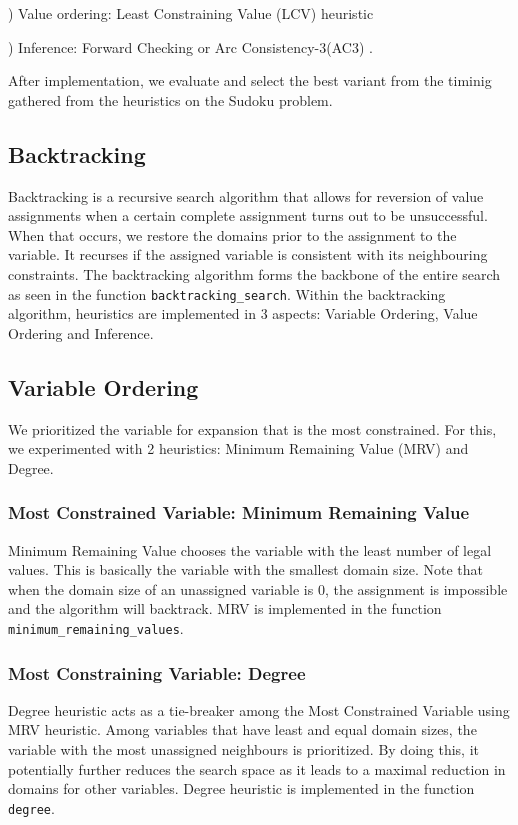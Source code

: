 \documentclass[9.5pt]{extarticle}
\begin{document}
\indent {}) Value ordering: Least Constraining Value (LCV) heuristic 

\indent {}) Inference: Forward Checking or Arc Consistency-3(AC3) .  

After implementation, we evaluate and select the best variant from the timinig gathered from the \indent heuristics on the Sudoku problem. 

\subsection{Backtracking}

Backtracking is a recursive search algorithm that allows for reversion of value assignments when a certain complete assignment turns out to be unsuccessful. When that occurs, we restore the domains prior to the assignment to the variable. It recurses if the assigned variable is consistent with its neighbouring constraints.  The backtracking algorithm forms the backbone of the entire search as seen in the function \verb`backtracking_search`. Within the backtracking algorithm, heuristics are implemented in 3 aspects: Variable Ordering, Value Ordering and Inference.

\subsection{Variable Ordering}
We prioritized the variable for expansion that is the most constrained. For this, we experimented with 2 heuristics: Minimum Remaining Value (MRV) and Degree.

\subsubsection{Most Constrained Variable: Minimum Remaining Value}

Minimum Remaining Value chooses the variable with the least number of legal values. This is basically the variable with the smallest domain size. Note that when the domain size of an unassigned variable is 0, the assignment is impossible and the algorithm will backtrack. MRV is implemented in the function \verb`minimum_remaining_values`.

\subsubsection{Most Constraining Variable: Degree}
Degree heuristic acts as a tie-breaker among the Most Constrained Variable using MRV heuristic. Among variables that have least and equal domain sizes, the variable with the most unassigned neighbours is prioritized. By doing this, it potentially further reduces the search space as it leads to a maximal reduction in domains for other variables. Degree heuristic is implemented in the function \verb`degree`. 
\end{document}
